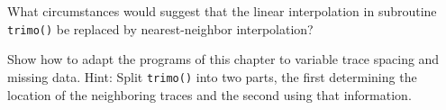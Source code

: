 %
%
%
%
%

\begin{exer}
\item
	What circumstances would suggest that the
	linear interpolation in subroutine \texttt{trimo()} 
	be replaced by nearest-neighbor interpolation?
\item
	Show how to adapt the programs of this chapter
	to variable trace spacing and missing data.
	Hint: Split {\tt trimo()} into two parts,
	the first determining the location of the neighboring
	traces and the second using that information.
\end{exer}

